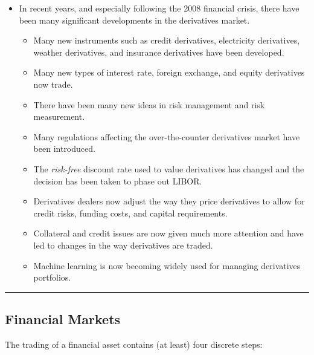 \documentclass[letterpaper,10pt]{article}
\begin{document}
\begin{itemize}
\item In recent years, and especially following the 2008 financial crisis, there have been many significant developments in the derivatives market.

\begin{itemize}

\item Many new instruments such as credit derivatives, electricity derivatives, weather derivatives, and insurance derivatives have been developed.

\item Many new types of interest rate, foreign exchange, and equity derivatives now trade.

\item There have been many new ideas in risk management and risk measurement.

\item Many regulations affecting the over-the-counter derivatives market have been introduced.

\item The {\em risk-free} discount rate used to value derivatives has changed and the decision has been taken to phase out LIBOR.

\item Derivatives dealers now adjust the way they price derivatives to allow for credit risks, funding costs, and capital requirements.

\item Collateral and credit issues are now given much more attention and have led to changes in the way derivatives are traded.

\item Machine learning is now becoming widely used for managing derivatives portfolios.

\end{itemize}

\end{itemize}

\bigskip

\hrule

\bigskip

\subsection{Financial Markets}

The trading of a financial asset contains (at least) four discrete steps:
\end{document}
